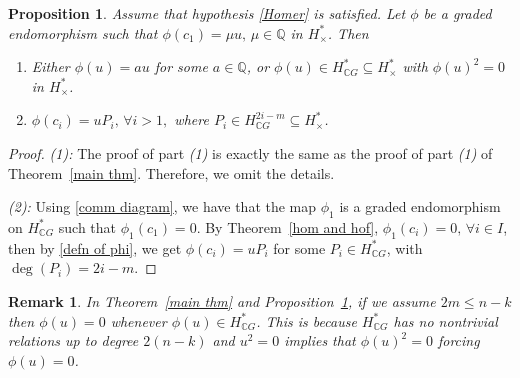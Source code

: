 \documentclass{amsart}
\newtheorem{proposition}[theorem]{Proposition}
\newtheorem{remark}[theorem]{Remark}
\newcommand{\thmref}[1]{Theorem~\ref{#1}}
\newcommand{\propref}[1]{Proposition~\ref{#1}}
\begin{document}
	
	\begin{proposition}\label{main thm 2}
		Assume %
that hypothesis \eqref{Homer} is satisfied.
		Let $\phi$ be a graded endomorphism such that $\phi(c_1)=\mu u,\, \mu \in \mathbb{Q}$ in $H^*_{\times}$. %
Then
		\begin{enumerate}
			\item Either $\phi(u)=a u$ for some $a \in \mathbb{Q}$, %
or $\phi(u) \in H^*_{\mathbb{C}G} \subseteq H^*_{\times}$ with $\phi(u)^2=0$ in %
$H^*_{\times}$.
			\item  $\phi(c_i) = uP_i, \, \forall i >1,$ where $P_i \in H^{2i-m}_{\mathbb CG}\subseteq H^*_\times$. 
		\end{enumerate}
	\end{proposition}
	\begin{proof} \textit{(1):} The %
proof of %
part \textit{(1)} is %
exactly the same as the proof of %
part \textit{(1)} of %
\thmref{main thm}. Therefore, we omit the %
details.
		
		\textit{(2):} Using %
\eqref{comm diagram}, we have that the map $\phi_1$ is a graded endomorphism on $H^*_{\mathbb{C}G}$ such that $\phi_1(c_1) =0$. By \thmref{hom and hof}, $\phi_1(c_i) =0, \, \forall i\in I$, then by \eqref{defn of phi}, we get $\phi(c_i) = uP_i$ for some $P_i \in H^*_{\mathbb{C}G}$, with $\deg(P_i) = 2i - m$. \end{proof}
	\begin{remark}
		In \thmref{main thm} and \propref{main thm 2}, if we assume $2m \leq n-k$  then $\phi(u)=0$ whenever $\phi(u) \in H^*_{\mathbb{C}G}$. This is because $H^*_{\mathbb{C}G}$ has no nontrivial relations up to degree $2(n-k)$ and $u^2=0$ implies that $\phi(u)^2=0$ forcing $\phi(u)=0$.
		
	\end{remark}
\end{document}
